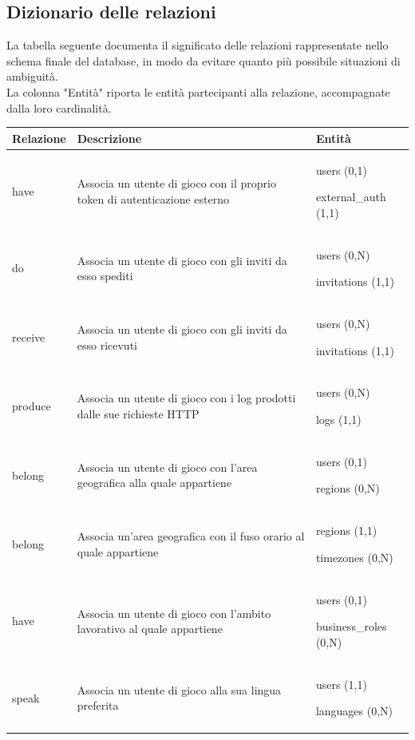 \subsection{Dizionario delle relazioni} %
La tabella seguente documenta il significato delle relazioni rappresentate nello schema finale del database, in modo da evitare quanto più possibile situazioni di ambiguità. \\
La colonna "Entità" riporta le entità partecipanti alla relazione, accompagnate dalla loro cardinalità.

\begin{longtabu} to \textwidth {l X[2] X}
	\toprule
	\textbf{Relazione} & \textbf{Descrizione} & \textbf{Entità}\\
	\midrule
	\endhead
	have       & Associa un utente di gioco con il proprio token di autenticazione esterno            & users (0,1)\par external\_auth (1,1) \\ \midrule
do           & Associa un utente di gioco con gli inviti da esso spediti                            & users (0,N)\par invitations (1,1)   \\ \midrule
receive      & Associa un utente di gioco con gli inviti da esso ricevuti                           & users (0,N)\par invitations (1,1)   \\ \midrule
produce      & Associa un utente di gioco con i log prodotti dalle sue richieste HTTP               & users (0,N)\par logs (1,1)   \\ \midrule
belong      & Associa un utente di gioco con l'area geografica alla quale appartiene                & users (0,1)\par regions (0,N)   \\ \midrule
belong      & Associa un'area geografica con il fuso orario al quale appartiene                     & regions (1,1)\par timezones (0,N)   \\ \midrule
have      & Associa un utente di gioco con l'ambito lavorativo al quale appartiene                  & users (0,1)\par business\_roles (0,N)   \\ \midrule
speak      & Associa un utente di gioco alla sua lingua preferita                                   & users (1,1)\par languages (0,N)   \\ \midrule

\end{longtabu}

